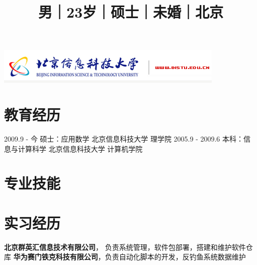 \documentclass[a4paper]{moderncv}
\title{\small{男｜23岁｜硕士｜未婚｜北京}}
\begin{document}
\begin{CJK*}{UTF8}{gbsn}
\includegraphics{bistu_logo.png}

\maketitle

\section{教育经历}
\cventry
{2009.9 - 今} { 硕士：应用数学 } { 北京信息科技大学 } { 理学院 } {} {}
\cventry
{2005.9 - 2009.6} { 本科：信息与计算科学 } { 北京信息科技大学 }
{ 计算机学院 } {} {}
\section{专业技能}
\section{实习经历}
{ \textbf{北京群英汇信息技术有限公司}， 负责系统管理，软件包部署，搭建和维护软件仓库 }
{ \textbf{华为赛门铁克科技有限公司}，负责自动化脚本的开发，反钓鱼系统数据维护}

\end{CJK*}
\end{document}
